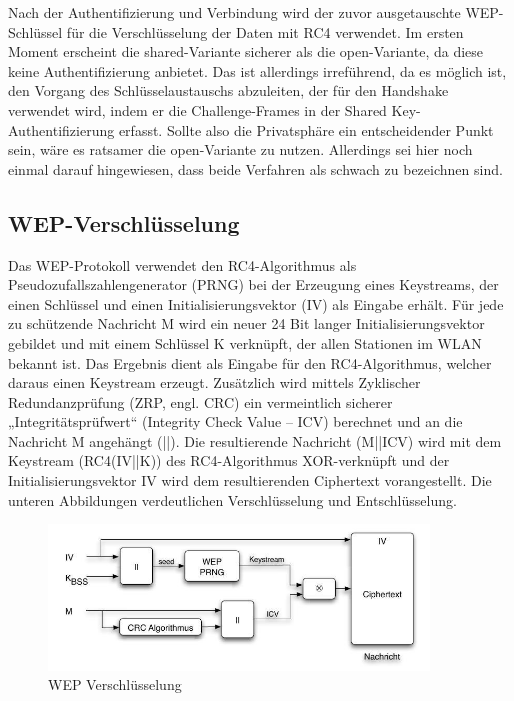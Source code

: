 	\noindent Nach der Authentifizierung und Verbindung wird der zuvor ausgetauschte WEP-Schlüssel für die Verschlüsselung der Daten mit RC4 verwendet. Im ersten Moment erscheint die shared-Variante sicherer als die open-Variante, da diese keine Authentifizierung anbietet. Das ist allerdings irreführend, da es möglich ist, den Vorgang des Schlüsselaustauschs abzuleiten, der für den Handshake verwendet wird, indem er die Challenge-Frames in der Shared Key-Authentifizierung erfasst. Sollte also die Privatsphäre ein entscheidender Punkt sein, wäre es ratsamer die open-Variante zu nutzen. Allerdings sei hier noch einmal darauf hingewiesen, dass beide Verfahren als schwach zu bezeichnen sind.

	\subsection{WEP-Verschlüsselung}

	Das WEP-Protokoll verwendet den RC4-Algorithmus als Pseudozufallszahlengenerator (PRNG) bei der Erzeugung eines Keystreams, der einen Schlüssel und einen Initialisierungsvektor (IV) als Eingabe erhält. Für jede zu schützende Nachricht M wird ein neuer 24 Bit langer Initialisierungsvektor gebildet und mit einem Schlüssel K verknüpft, der allen Stationen im WLAN bekannt ist. Das Ergebnis dient als Eingabe für den RC4-Algorithmus, welcher daraus einen Keystream erzeugt. Zusätzlich wird mittels Zyklischer Redundanzprüfung (ZRP, engl. CRC) ein vermeintlich sicherer „Integritätsprüfwert“ (Integrity Check Value – ICV) berechnet und an die Nachricht M angehängt (||). Die resultierende Nachricht (M||ICV) wird mit dem Keystream (RC4(IV||K)) des RC4-Algorithmus XOR-verknüpft und der Initialisierungsvektor IV wird dem resultierenden Ciphertext vorangestellt. Die unteren Abbildungen verdeutlichen Verschlüsselung und Entschlüsselung.

	\begin{figure}[H]
		\centering
		\includegraphics[width=0.9\textwidth]{images/WLAN/WEPKodierung.JPG}
		\caption{WEP Verschlüsselung}
		\label{fig:WEP Verschlüsselung}
	\end{figure}

